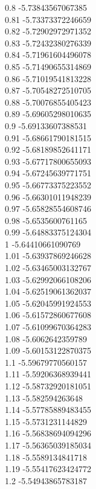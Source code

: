 {0.8	-5.73843567067385\\
0.81	-5.73373372246659\\
0.82	-5.72902972971352\\
0.83	-5.72432380276339\\
0.84	-5.71961604496078\\
0.85	-5.71490655314869\\
0.86	-5.71019541813228\\
0.87	-5.70548272510705\\
0.88	-5.70076855405423\\
0.89	-5.69605298010635\\
0.9	-5.69133607388531\\
0.91	-5.68661790181515\\
0.92	-5.68189852641171\\
0.93	-5.67717800655093\\
0.94	-5.67245639771751\\
0.95	-5.66773375223552\\
0.96	-5.66301011948239\\
0.97	-5.65828554608746\\
0.98	-5.6535600761165\\
0.99	-5.64883375124304\\
1	-5.64410661090769\\
1.01	-5.63937869246628\\
1.02	-5.63465003132767\\
1.03	-5.62992066108206\\
1.04	-5.62519061362037\\
1.05	-5.62045991924553\\
1.06	-5.61572860677608\\
1.07	-5.61099670364283\\
1.08	-5.6062642359789\\
1.09	-5.60153122870375\\
1.1	-5.59679770560157\\
1.11	-5.59206368939441\\
1.12	-5.58732920181051\\
1.13	-5.582594263648\\
1.14	-5.57785889483455\\
1.15	-5.5731231144829\\
1.16	-5.56838694094296\\
1.17	-5.56365039185034\\
1.18	-5.5589134841718\\
1.19	-5.55417623424772\\
1.2	-5.54943865783187\\
}

